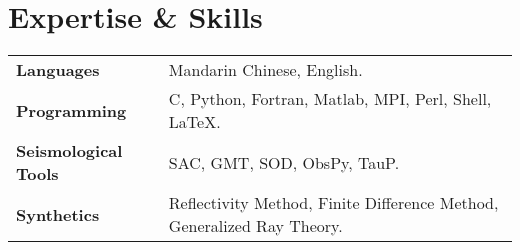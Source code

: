 \section*{Expertise \& Skills}

\begin{tabular}{p{} p{}}
\textbf{Languages} & Mandarin Chinese, English. \\
\textbf{Programming} & C, Python, Fortran, Matlab, MPI, Perl, Shell, LaTeX. \\
\textbf{Seismological Tools} & SAC, GMT, SOD, ObsPy, TauP. \\
\textbf{Synthetics} & Reflectivity Method, Finite Difference Method, Generalized Ray Theory.\\
\end{tabular}
